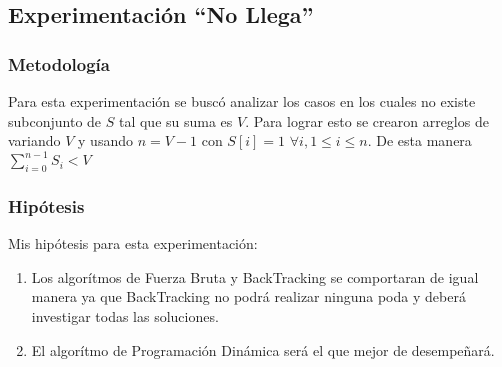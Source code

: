 \subsection{Experimentaci\'on ``No Llega''}
\subsubsection{Metodolog\'ia}
\par Para esta experimentaci\'on se busc\'o analizar los casos en los cuales no existe subconjunto de $S$ tal que su
suma es $V$. Para lograr esto se crearon arreglos de variando $V$ y usando $n = V-1$ con $S[i] = 1$ 
$\forall i, 1\leq i \leq n$. De esta manera $\sum_{i=0}^{n-1}S_i < {V}$

\subsubsection{Hip\'otesis}
Mis hip\'otesis para esta experimentaci\'on:
\begin{enumerate}[I]
    \item Los algor\'itmos de Fuerza Bruta y BackTracking se comportaran de igual manera ya que BackTracking no podr\'a
    realizar ninguna poda y deber\'a investigar todas las soluciones.
    \item El algor\'itmo de Programaci\'on Din\'amica ser\'a el que mejor de desempe\~nar\'a.
\end{enumerate}